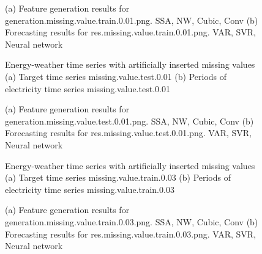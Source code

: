 \documentclass[12pt]{article}
\begin{document}
\begin{figure}
\centering
{}
\caption{(a)	Feature generation results for	generation.missing.value.train.0.01.png.	SSA, NW, Cubic, Conv	(b)	Forecasting results for	res.missing.value.train.0.01.png.	VAR, SVR, Neural network	}
\end{figure}


\begin{figure}
\centering
{}
\caption{Energy-weather time series with artificially inserted missing values	(a) Target time series	missing.value.test.0.01	(b) Periods of electricity time series	missing.value.test.0.01	}
\end{figure}


\begin{figure}
\centering
{}
\caption{(a)	Feature generation results for	generation.missing.value.test.0.01.png.	SSA, NW, Cubic, Conv	(b)	Forecasting results for	res.missing.value.test.0.01.png.	VAR, SVR, Neural network	}
\end{figure}


\begin{figure}
\centering
{}
\caption{Energy-weather time series with artificially inserted missing values	(a) Target time series	missing.value.train.0.03	(b) Periods of electricity time series	missing.value.train.0.03	}
\end{figure}


\begin{figure}
\centering
{}
\caption{(a)	Feature generation results for	generation.missing.value.train.0.03.png.	SSA, NW, Cubic, Conv	(b)	Forecasting results for	res.missing.value.train.0.03.png.	VAR, SVR, Neural network	}
\end{figure}
\end{document}
